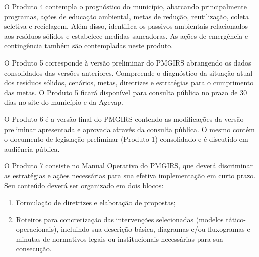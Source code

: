 O Produto 4 contempla o prognóstico do município, abarcando principalmente programas, ações de educação ambiental, metas de redução, reutilização, coleta seletiva e reciclagem. Além disso, identifica os passivos ambientais relacionados aos resíduos sólidos e estabelece medidas saneadoras. As ações de emergência e contingência também são contempladas neste produto.

O Produto 5 corresponde à versão preliminar do PMGIRS abrangendo os dados consolidados das versões anteriores. Compreende o diagnóstico da situação atual dos resíduos sólidos, cenários, metas, diretrizes e estratégias para o cumprimento das metas. O Produto 5 ficará disponível para consulta pública no prazo de 30 dias no site do município e da Agevap.

O Produto 6 é a versão final do PMGIRS contendo as modificações da versão preliminar apresentada e aprovada através da consulta pública. O mesmo contém o documento de legislação preliminar (Produto 1) consolidado e é discutido em audiência pública.

\newpage
O Produto 7 consiste no Manual Operativo do PMGIRS, que deverá discriminar as estratégias e ações necessárias para sua efetiva implementação em curto prazo. Seu conteúdo deverá ser organizado em dois blocos:

\begin{enumerate}[label=\roman*]
	\item Formulação de diretrizes e elaboração de propostas; 
	\item Roteiros para concretização das intervenções selecionadas (modelos tático-operacionais), incluindo sua descrição básica, diagramas e/ou fluxogramas e minutas de normativos legais ou institucionais necessárias para sua consecução.
\end{enumerate}
